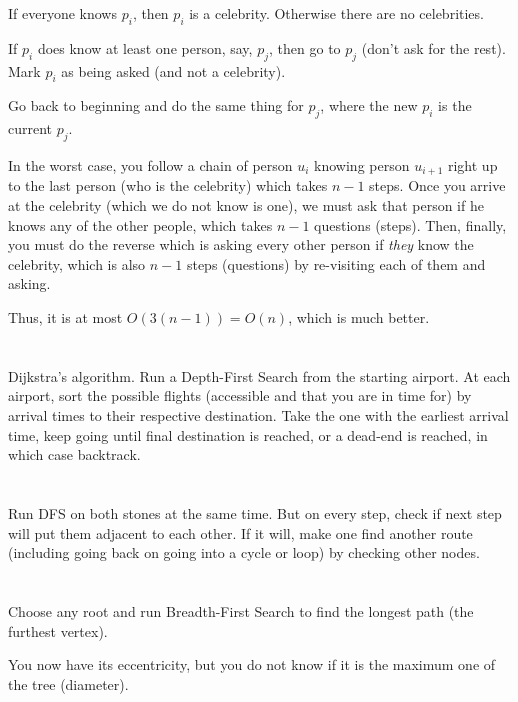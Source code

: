 \documentclass[11pt,letterpaper]{article}
\begin{document}
	If everyone knows $p_i$, then $p_i$ is a celebrity.
	Otherwise there are no celebrities.\newline
	
	If $p_i$ does know at least one person, say, $p_j$, then go to $p_j$ (don't ask for the rest). Mark $p_i$ as being asked (and not a celebrity).\newline
	
	Go back to beginning and do the same thing for $p_j$, where the new $p_i$ is the current $p_j$.\newline
	
	In the worst case, you follow a chain of person $u_i$ knowing person $u_{i+1}$ right up to the last person (who is the celebrity) which takes $n-1$ steps. Once you arrive at the celebrity (which we do not know is one), we must ask that person if he knows any of the other people, which takes $n-1$ questions (steps). Then, finally, you must do the reverse which is asking every other person if \textit{they} know the celebrity, which is also $n-1$ steps (questions) by re-visiting each of them and asking.
	
	Thus, it is at most $O(3(n-1))=O(n)$, which is much better.
	
	\section{}
	Dijkstra's algorithm.
	Run a Depth-First Search from the starting airport. At each airport, sort the possible flights (accessible and that you are in time for) by arrival times to their respective destination. Take the one with the earliest arrival time, keep going until final destination is reached, or a dead-end is reached, in which case backtrack.
	
	\section{}
	Run DFS on both stones at the same time. But on every step, check if next step will put them adjacent to each other. If it will, make one find another route (including going back on going into a cycle or loop) by checking other nodes.
	
	\section{}
	Choose any root and run Breadth-First Search to find the longest path (the furthest vertex).
	
	You now have its eccentricity, but you do not know if it is the maximum one of the tree (diameter).
	
\end{document}
